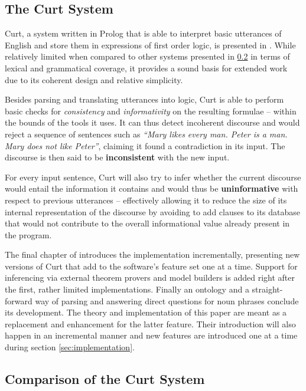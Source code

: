 \documentclass[a4paper]{article}
\newcommand{\term}[1]{\textsf{\textbf{#1}}} %
\newcommand{\pn}{\textsf} %
\newcommand{\curt}{\pn{Curt}}
\newcommand{\prol}{\pn{Prolog}}
\theoremstyle{remark}
\theoremstyle{remark}
\theoremstyle{definition}
\theoremstyle{definition}
\begin{document}
\subsection{The Curt System} \label{sec:curt}

\curt, a system written in \prol{} that is able to interpret basic utterances
of English and store them in expressions of first order logic, is
presented in \cite[chapter 6]{blackburnbos:cl1}. While relatively limited when
compared to other systems presented in \ref{sec:comparison} in terms of lexical
and grammatical coverage, it provides a sound basis for extended work due to
its coherent design and relative simplicity.

Besides parsing and translating utterances into logic, \curt{} is able to perform
basic checks for \emph{consistency} and \emph{informativity} on the resulting
formulae -- within the bounds of the tools it uses.
It can thus detect incoherent discourse and would reject a sequence of
sentences such as \emph{``Mary likes every man. Peter is a man. Mary does not
like Peter''}, claiming it found a contradiction in its input. The discourse is
then said to be \term{inconsistent} with the new input.

For every input
sentence, \curt{} will also try to infer whether the current discourse would
entail the information it contains and would thus be \term{uninformative} with
respect to previous utterances – effectively allowing it to
reduce the size of its internal representation of the discourse by avoiding to
add clauses to its database that would not contribute to the overall informational value
already present in the program.

The final chapter of \cite{blackburnbos:cl1} introduces the implementation
incrementally, presenting new versions of \curt{} that add to the software's
feature set one at a time. Support for inferencing via external theorem provers
and model builders is added right after the first, rather limited implementations.
Finally an ontology and a straight-forward way of parsing and answering direct
questions for noun phrases conclude its development. The theory and
implementation of this paper are meant as a replacement and enhancement for the
latter feature. Their introduction will also happen in an incremental manner and new features
are introduced one at a time during section \ref{sec:implementation}.

\subsection{Comparison of the Curt System}\label{sec:comparison}
\end{document}

